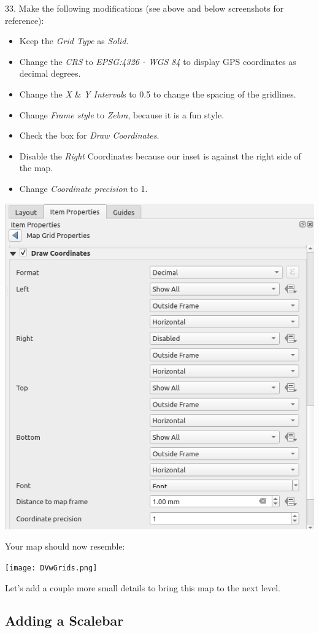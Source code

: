 \documentclass[oneside,a4paper,11pt,explicit]{book}
\begin{document}
\begin{singlespacing}
33. Make the following modifications (see above and below screenshots for reference):
	\begin{itemize}
		\item Keep the \textit{Grid Type} as \textit{Solid}. 
		\item Change the \textit{CRS} to \textit{EPSG:4326 - WGS 84} to display GPS coordinates as decimal degrees. 
		\item Change the \textit{X} \& \textit{Y Interval}s to 0.5 to change the spacing of the gridlines.
		\item Change \textit{Frame style} to \textit{Zebra}, because it is a fun style.
		\item Check the box for \textit{Draw Coordinates}.
		\item Disable the \textit{Right} Coordinates because our inset is against the right side of the map.
		\item Change \textit{Coordinate precision} to 1. 
	\end{itemize}
\end{singlespacing}

\centerline{\includegraphics[width=.5\textwidth]{GridProps2.png}}

Your map should now resemble:

\centerline{\texttt{[image: DVwGrids.png]}}


Let's add a couple more small details to bring this map to the next level.

\subsection{Adding a Scalebar}
\end{document}
